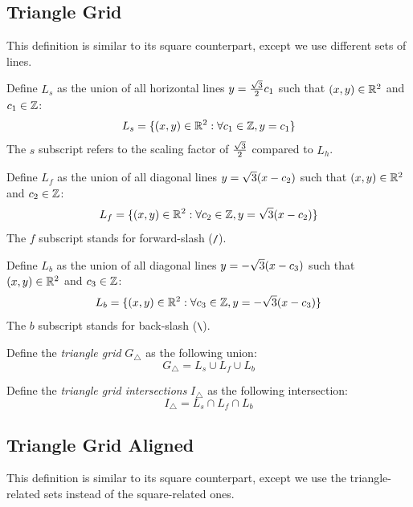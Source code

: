 \subsection{Triangle Grid}

This definition is similar to its square counterpart, except we use different sets of lines. \newline

Define $L_s$ as the union of all horizontal lines $y = \frac{\sqrt{3}}{2} c_1$ such that $(x,y) \in \mathbb{R}^2$ and $c_1 \in \mathbb{Z}$:
$$L_s = \{ (x, y) \in \mathbb{R}^2 : \forall c_1 \in \mathbb{Z}, y = c_1 \}$$
The $s$ subscript refers to the scaling factor of $ \frac{\sqrt{3}}{2}$ compared to $L_h$.

Define $L_f$ as the union of all diagonal lines $y = \sqrt{3} (x-c_2)$ such that $(x,y) \in \mathbb{R}^2$ and $c_2 \in \mathbb{Z}$:
$$L_f = \{ (x, y) \in \mathbb{R}^2 : \forall c_2 \in \mathbb{Z}, y = \sqrt{3} (x-c_2) \}$$
The $f$ subscript stands for forward-slash (\verb|/|).

Define $L_b$ as the union of all diagonal lines $y = - \sqrt{3} (x-c_3)$ such that $(x,y) \in \mathbb{R}^2$ and $c_3 \in \mathbb{Z}$:
$$L_b = \{ (x, y) \in \mathbb{R}^2 : \forall c_3 \in \mathbb{Z}, y = - \sqrt{3} (x-c_3) \}$$
The $b$ subscript stands for back-slash (\verb|\|).

Define the \textit{triangle grid} $G_{\triangle}$ as the following union:
$$G_{\triangle} = L_s \cup L_f \cup L_b$$

Define the \textit{triangle grid intersections} $I_{\triangle}$ as the following intersection:
$$I_{\triangle} = L_s \cap L_f \cap L_b$$

\subsection{Triangle Grid Aligned}

This definition is similar to its square counterpart, except we use the triangle-related sets instead of the square-related ones.
\newline

